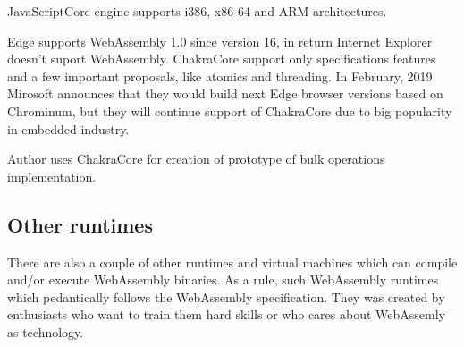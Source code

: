 JavaScriptCore engine supports i386, x86-64 and ARM architectures.

Edge supports WebAssembly 1.0 since version 16, in return Internet Explorer doesn't suport WebAssembly.
ChakraCore support only specifications features and a few important proposals, like atomics and threading.
In February, 2019 Mirosoft announces that they would build next Edge browser versions based on Chrominum, but they will continue support of ChakraCore due to big popularity in embedded industry.

Author uses ChakraCore for creation of prototype of bulk operations implementation.

\subsection{Other runtimes}

There are also a couple of other runtimes and virtual machines which can compile and/or execute WebAssembly binaries.
As a rule, such WebAssembly runtimes which pedantically follows the WebAssembly specification.
They was created by enthusiasts who want to train them hard skills or who cares about WebAssemly as technology.
